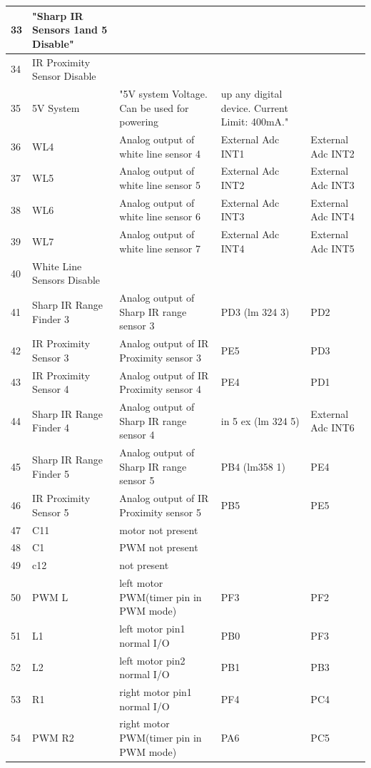 \documentclass[a4paper,10pt,oneside]{article}
\begin{document}
{\begin{longtable}{|p{}|p{}|p{}|p{}|p{}|}
				33&	"Sharp IR Sensors 1and 5 Disable" & &	&	\\ \hline
				34&	IR Proximity Sensor Disable& & &	\\ \hline	
				35&	5V System&	"5V system Voltage. Can be used for powering&
				up any digital device. Current Limit: 400mA." & \\ \hline
				36&	WL4&	Analog output of white line sensor 4&	External Adc INT1&	External Adc INT2\\ \hline
				37&	WL5&	Analog output of white line sensor 5&	External Adc INT2&	External Adc INT3\\ \hline
				38&	WL6&	Analog output of white line sensor 6	&External Adc INT3&	External Adc INT4\\ \hline
				39&	WL7&	Analog output of white line sensor 7&	External Adc INT4&	External Adc INT5\\ \hline
				40&	White Line Sensors Disable&& &\\ \hline		
				41&	Sharp IR Range Finder 3&	Analog output of Sharp IR range sensor 3	&PD3 (lm 324 3) & PD2\\ \hline
				42&	IR Proximity Sensor 3&	Analog output of IR Proximity sensor 3	&PE5 & PD3\\ \hline
				43&	IR Proximity Sensor 4&	Analog output of IR Proximity sensor 4&	PE4 & PD1\\ \hline
				44&	Sharp IR Range Finder 4	&Analog output of Sharp IR range sensor 4&	in 5 ex (lm 324 5) &	External Adc INT6\\ \hline
				45&	Sharp IR Range Finder 5&	Analog output of Sharp IR range sensor 5&	PB4 (lm358 1) & PE4\\ \hline
				46&	IR Proximity Sensor 5&	Analog output of IR Proximity sensor 5&	PB5 & PE5\\ \hline
				47&	C11& motor 	not present& &	\\ \hline
				48&	C1 &PWM	not present	& &\\ \hline
				49&	c12&	not present	& &\\ \hline
				50&	PWM L&	left motor PWM(timer pin in PWM mode)&	PF3 & PF2\\ \hline
				51&	L1&	left motor pin1 normal I/O&	PB0 & PF3\\ \hline
				52&	L2&	left motor pin2 normal I/O&	PB1 & PB3\\ \hline
				53&	R1&	right motor pin1 normal I/O&	PF4 & PC4\\ \hline
				54&	PWM R2&	right motor PWM(timer pin in PWM  mode)&	PA6 & PC5\\ \hline

\end{longtable}}
\end{document}

